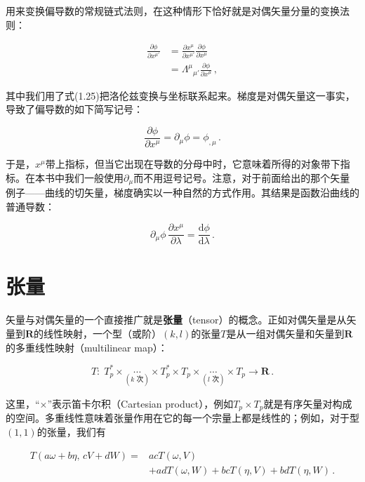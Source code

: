用来变换偏导数的常规链式法则，在这种情形下恰好就是对偶矢量分量的变换法则：

\begin{align*}
\frac{\partial\phi}{\partial x^{\mu'}}&=\frac{\partial x^{\mu}}{\partial x^{\mu'}}\frac{\partial\phi}{\partial x^{\mu}}\\
&=\Lambda^{\mu}{}_{\mu'}\frac{\partial\phi}{\partial x^{\mu}}\,,
\tag{1.53}
\end{align*}

其中我们用了式(1.25)把洛伦兹变换与坐标联系起来。梯度是对偶矢量这一事实，导致了偏导数的如下简写记号：

\begin{equation*}
\frac{\partial\phi}{\partial x^{\mu}}=\partial_{\mu}\phi=\phi_{,\mu}\,.
\tag{1.54}
\end{equation*}

于是，$x^{\mu}$带上指标，但当它出现在导数的分母中时，它意味着所得的对象带下指标。在本书中我们一般使用$\partial_{\mu}$而不用逗号记号。注意，对于前面给出的那个矢量例子——曲线的切矢量，梯度确实以一种自然的方式作用。其结果是函数沿曲线的普通导数：

\begin{equation*}
\partial_{\mu}\phi\,\frac{\partial x^{\mu}}{\partial\lambda}=\frac{\mathrm{d}\phi}{\mathrm{d}\lambda}\,.
\tag{1.55}
\end{equation*}

\section{张量}

矢量与对偶矢量的一个直接推广就是\textbf{张量}（tensor）的概念。正如对偶矢量是从矢量到$\mathbf{R}$的线性映射，一个型（或阶）$(k,l)$的张量$T$是从一组对偶矢量和矢量到$\mathbf{R}$的多重线性映射（multilinear map）：

\begin{equation*}
T:\;T_p^{*}\times\underset{(k\text{ 次})}{\cdots}\times T_p^{*}
\times T_p\times\underset{(l\text{ 次})}{\cdots}\times T_p\rightarrow\mathbf{R}\,.
\tag{1.56}
\end{equation*}

这里，“$\times$”表示笛卡尔积（Cartesian product），例如$T_p\times T_p$就是有序矢量对构成的空间。多重线性意味着张量作用在它的每一个宗量上都是线性的；例如，对于型$(1,1)$的张量，我们有

\begin{align*}
T(a\omega+b\eta,\,cV+dW)={}&acT(\omega,V)\\
&+adT(\omega,W)+bcT(\eta,V)+bdT(\eta,W)\,.
\tag{1.57}
\end{align*}


